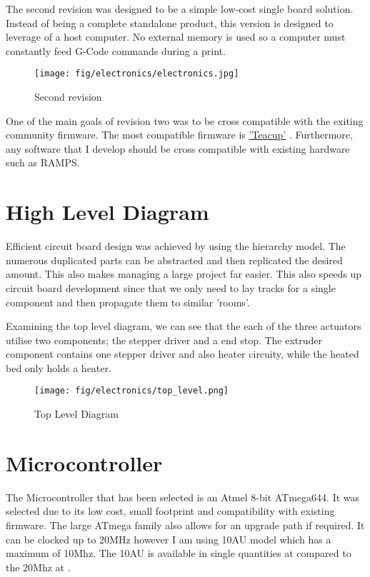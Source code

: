 \documentclass[a4paper, 11pt, twoside]{Thesis}  %
\begin{document}
The second revision was designed to be a simple low-cost single board solution. Instead of being a complete standalone product, this version is designed to leverage of a host computer. No external memory is used so a computer must constantly feed G-Code commands during a print. 

\begin{figure}[H]
\centering%
\texttt{[image: fig/electronics/electronics.jpg]}
\caption{Second revision}
\label{fig:electronics.jpg}
\end{figure}

One of the main goals of revision two was to be cross compatible with the exiting community firmware. The most compatible firmware is \href{http://github.com/Traumflug/Teacup_Firmware}{'Teacup'} . Furthermore, any software that I develop should be cross compatible with existing hardware such as RAMPS.


\section{High Level Diagram}

Efficient circuit board design was achieved by using the hierarchy model. The numerous duplicated parts can be abstracted and then replicated the desired amount. This also makes managing a large project far easier. This also speeds up circuit board development since that we only need to lay tracks for a single component and then propagate them to similar 'rooms'.

Examining the top level diagram, we can see that the each of the three actuators utilise two components; the stepper driver and a end stop. The extruder component contains one stepper driver and also heater circuity, while the heated bed only holds a heater. 


\begin{figure}[H]
\centering%
\texttt{[image: fig/electronics/top\_level.png]}
\caption{Top Level Diagram}
\label{fig:top_level.png}
\end{figure}\section{Microcontroller}

The Microcontroller that has been selected is an Atmel 8-bit ATmega644. It was selected due to its low cost, small footprint and compatibility with existing firmware. The large ATmega family also allows for an upgrade path if required. It can be clocked up to 20MHz however I am using 10AU model which has a maximum of 10Mhz. The 10AU is available in single quantities at  compared to the 20Mhz at .
\end{document}
